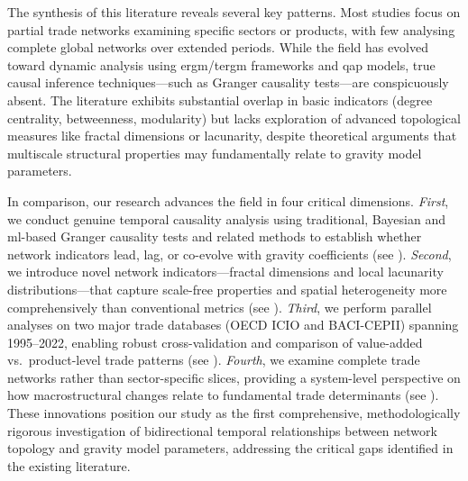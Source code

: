 \documentclass[preprint, 3p,
authoryear]{elsarticle} %
\begin{document}
The synthesis of this literature reveals several key patterns. Most
studies focus on partial trade networks examining specific sectors or
products, with few analysing complete global networks over extended
periods. While the field has evolved toward dynamic analysis using
\gls{ergm}/\gls{tergm} frameworks and \gls{qap} models, true causal
inference techniques---such as Granger causality tests---are
conspicuously absent. The literature exhibits substantial overlap in
basic indicators (degree centrality, betweenness, modularity) but lacks
exploration of advanced topological measures like fractal dimensions or
lacunarity, despite theoretical arguments that multiscale structural
properties may fundamentally relate to gravity model parameters.

In comparison, our research advances the field in four critical
dimensions. \textit{First}, we conduct genuine temporal causality
analysis using traditional, Bayesian and \gls{ml}-based Granger
causality tests and related methods to establish whether network
indicators lead, lag, or co-evolve with gravity coefficients (see
). \textit{Second}, we introduce novel network
indicators---fractal dimensions and local lacunarity
distributions---that capture scale-free properties and spatial
heterogeneity more comprehensively than conventional metrics (see
). \textit{Third}, we perform parallel analyses on two major
trade databases (OECD ICIO and BACI-CEPII) spanning 1995--2022, enabling
robust cross-validation and comparison of value-added vs.~product-level
trade patterns (see ). \textit{Fourth}, we examine complete
trade networks rather than sector-specific slices, providing a
system-level perspective on how macrostructural changes relate to
fundamental trade determinants (see ). These innovations
position our study as the first comprehensive, methodologically rigorous
investigation of bidirectional temporal relationships between network
topology and gravity model parameters, addressing the critical gaps
identified in the existing literature.
\end{document}
